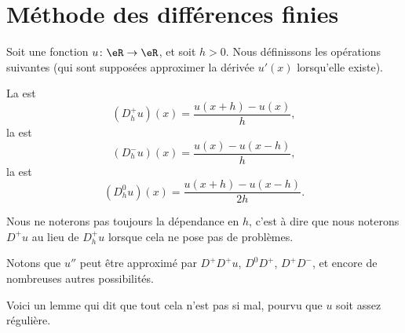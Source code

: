 \section{Méthode des différences finies}

Soit une fonction \( u\colon \eR\to \eR\), et soit \( h>0\). Nous définissons les opérations suivantes (qui sont supposées approximer la dérivée \( u'(x)\) lorsqu'elle existe).

\begin{definition}
    La  est 
    \begin{equation}
        (D^+_hu)(x)=\frac{ u(x+h)-u(x) }{ h },
    \end{equation}
    la  est 
    \begin{equation}
        (D^-_hu)(x)=\frac{ u(x)-u(x-h) }{ h },
    \end{equation}
    la  est 
    \begin{equation}
        (D^0_hu)(x)=\frac{ u(x+h)-u(x-h) }{ 2h }.
    \end{equation}
\end{definition}
Nous ne noterons pas toujours la dépendance en \( h\), c'est à dire que nous noterons \( D^+u\) au lieu de \( D^+_hu\) lorsque cela ne pose pas de problèmes.

Notons que \( u''\) peut être approximé par \( D^+D^+u\), \( D^0D^+\), \( D^+D^-\), et encore de nombreuses autres possibilités.

Voici un lemme qui dit que tout cela n'est pas si mal, pourvu que \( u\) soit assez régulière.

